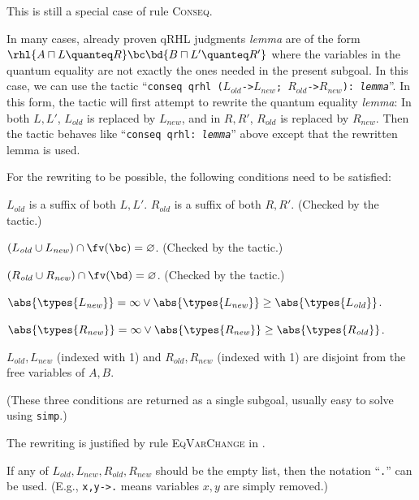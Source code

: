 \documentclass{article}
\renewcommand\ruleref[1]{rule \hbox{\textsc{#1}}}
\begin{document}
This is still a special case of \ruleref{Conseq}.


\bigskip

In many cases, already proven qRHL judgments \textit{lemma} are of the
form $\rhl{A \sqcap L\quanteq R}\bc\bd {B \sqcap L'\quanteq R'}$ where
the variables in the quantum equality are not exactly the ones needed
in the present subgoal. In this case, we can use the tactic
``\texttt{conseq qrhl ($L_\mathit{old}$->$L_\mathit{new}$;
  $R_\mathit{old}$->$R_\mathit{new}$): \textit{lemma}}''.  In this
form, the tactic will first attempt to rewrite the quantum equality
\textit{lemma}: In both $L,L'$, $L_\mathit{old}$ is replaced by
$L_\mathit{new}$, and in $R,R'$, $R_\mathit{old}$ is replaced by
$R_\mathit{new}$.  Then the tactic behaves like ``\texttt{conseq qrhl:
  \textit{lemma}}'' above except that the rewritten lemma is used.

For the rewriting to be possible, the following conditions need to be
satisfied:
\begin{compactitem}
\item $L_\mathit{old}$ is a suffix of both $L,L'$. $R_\mathit{old}$ is a suffix of both $R,R'$.
   (Checked by the tactic.)
\item $(L_\mathit{old}\cup L_\mathit{new}) \cap \fv(\bc) = \varnothing$. (Checked by the tactic.)
\item $(R_\mathit{old}\cup R_\mathit{new}) \cap \fv(\bd) = \varnothing$. (Checked by the tactic.)
\item
  \begin{compactitem}
    \item $\abs{\types{L_{\mathit{new}}}} = \infty \vee \abs{\types{L_\mathit{new}}} \geq \abs{\types{L_\mathit{old}}}$.
    \item $\abs{\types{R_{\mathit{new}}}} = \infty \vee \abs{\types{R_\mathit{new}}} \geq \abs{\types{R_\mathit{old}}}$.
    \item $L_{\mathit{old}}, L_{\mathit{new}}$ (indexed with 1) and
       $R_{\mathit{old}}, R_{\mathit{new}}$ (indexed with 1) are disjoint from the free variables of $A,B$.
  \end{compactitem}
  (These three conditions are returned as a single subgoal, usually easy to solve using \texttt{simp}.)
\end{compactitem}
The rewriting is justified by \ruleref{EqVarChange} in \cite{local-variables}.

If any of
$L_\mathit{old},L_\mathit{new},R_\mathit{old},R_\mathit{new}$ should
be the empty list, then the notation ``\texttt{.}'' can be
used. (E.g., \texttt{x,y->.} means variables $x,y$ are simply
removed.)
\end{document}
